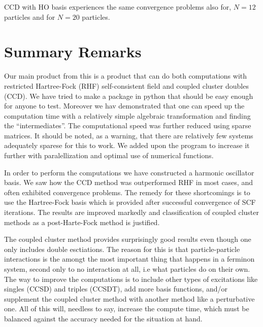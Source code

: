 \documentclass[
    a4paper, aps, twocolumn, floatfix, superscriptaddress,
    nofootinbib]{revtex4-1}
\newcommand{\1}{\mathds{1}}
\begin{document}
        CCD with HO basis experiences the same convergence problems also for,
        $N=12$ particles and for $N=20$ particles.


    \section{Summary Remarks}
        
        Our main product from this is a product that can do both computations with
        restricted Hartree-Fock (RHF) self-consistent field and coupled cluster 
        doubles (CCD). We have tried
        to make a package in python that should be easy enough for anyone to test. 
        Moreover we hav demonstrated that one can speed up the computation time with
        a relatively simple algebraic transformation and finding the ``intermediates''.
        The computational speed was further reduced using sparse matrices. It should
        be noted, as a warning, that there are relatively few systems adequately sparese
        for this to work. We added upon the program to increase it further with 
        paralellization and optimal use of numerical functions.

        In order to perform the computations we have constructed a harmonic oscillator
        basis. We saw how the CCD method was outperformed RHF in most cases, and often
        exhibited convergence problems. The remedy for these shortcomings is to use
        the Hartree-Fock basis which is provided after successful convergence of 
        SCF iterations. The results are improved markedly and classification of coupled
        cluster methods as a post-Harte-Fock method is justified. 

        The coupled cluster method provides surprisingly good results even
        though one only includes double esctiations. The reason for this is that
        particle-particle interactions is the amongt the most important thing that 
        happens in a ferminon system, second only to no interaction at all, i.e 
        what particles do on their own. The way to improve the computations is to
        include other types of excitations like singles (CCSD) and triples (CCSDT),
        add more basis functions, and/or supplement the coupled cluster method with 
        another method like a perturbative one. All of this will, needless to say,
        increase the compute time, which must be balanced against the accuracy needed
        for the situation at hand. 
\end{document}
